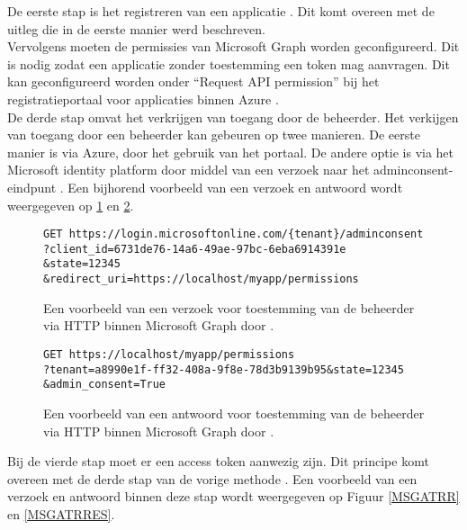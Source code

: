 De eerste stap is het registreren van een applicatie \autocite{Microsoft2023s}. Dit komt overeen met de uitleg die in de eerste manier werd beschreven. \\

Vervolgens moeten de permissies van Microsoft Graph worden geconfigureerd. Dit is nodig zodat een applicatie zonder toestemming een token mag aanvragen. Dit kan geconfigureerd worden onder “Request \ac{API} permission” bij het registratieportaal voor applicaties binnen Azure \autocite{Microsoft2023s}. \\

De derde stap omvat het verkrijgen van toegang door de beheerder. Het verkijgen van toegang door een beheerder kan gebeuren op twee manieren. De eerste manier is via Azure, door het gebruik van het portaal. De andere optie is via het Microsoft identity platform door middel van een verzoek naar het adminconsent-eindpunt \autocite{Microsoft2023s}. Een bijhorend voorbeeld van een verzoek en antwoord wordt weergegeven op \ref{MSGRAR} en \ref{MSGRARES}. \\

\begin{figure}[!h]
    \scriptsize
    \begin{verbatim}
GET https://login.microsoftonline.com/{tenant}/adminconsent
?client_id=6731de76-14a6-49ae-97bc-6eba6914391e
&state=12345
&redirect_uri=https://localhost/myapp/permissions
    \end{verbatim}    
    \caption[Voorbeeld Adminconsent request Microsoft Graph]{Een voorbeeld van een verzoek voor toestemming van de beheerder via \ac{HTTP} binnen Microsoft Graph door \textcite{Microsoft2023s}.}
    \label{MSGRAR}
\end{figure}

\begin{figure}[!h]
    \scriptsize
    \begin{verbatim}
GET https://localhost/myapp/permissions
?tenant=a8990e1f-ff32-408a-9f8e-78d3b9139b95&state=12345
&admin_consent=True
    \end{verbatim}    
    \caption[Voorbeeld Adminconsent respons Microsoft Graph]{Een voorbeeld van een antwoord voor toestemming van de beheerder via \ac{HTTP} binnen Microsoft Graph door \textcite{Microsoft2023s}.}
    \label{MSGRARES}
\end{figure}

Bij de vierde stap moet er een access token aanwezig zijn. Dit principe komt overeen met de derde stap van de vorige methode \autocite{Microsoft2023s}. Een voorbeeld van een verzoek en antwoord binnen deze stap wordt weergegeven op Figuur \ref{MSGATRR} en \ref{MSGATRRES}. \\

